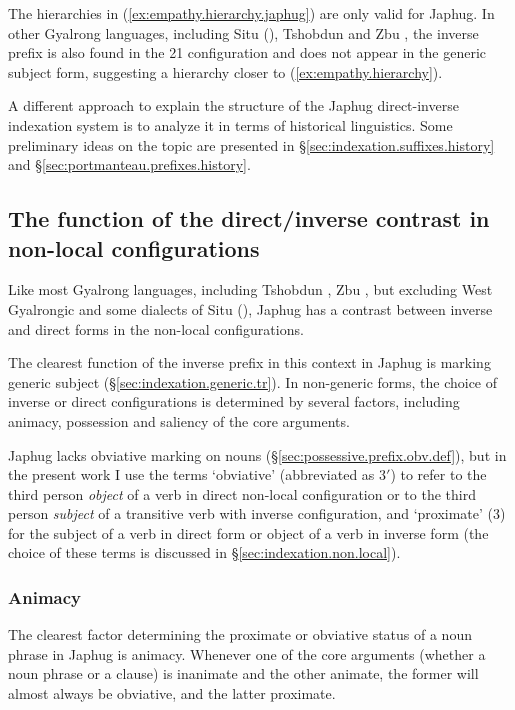 The hierarchies in (\ref{ex:empathy.hierarchy.japhug}) are only valid for Japhug. In other Gyalrong languages, including Situ (\citealt{delancey81direction, jackson15sastod, zhangsy19obviative}), Tshobdun \citep{jackson02rentongdengdi} and Zbu \citep{gongxun14agreement}, the inverse prefix is also found in the 2\fl{}1 configuration and does not appear in the generic subject form, suggesting a hierarchy closer to (\ref{ex:empathy.hierarchy}).

A different approach to explain the structure of the Japhug direct-inverse indexation system is to analyze it in terms of historical linguistics. Some preliminary ideas on the topic are presented in §\ref{sec:indexation.suffixes.history} and §\ref{sec:portmanteau.prefixes.history}.




\subsection{The function of the direct/inverse contrast in non-local configurations} \label{sec:inverse.3.3.saliency}
Like most Gyalrong languages, including Tshobdun \citep{jackson02rentongdengdi}, Zbu \citep{gongxun14agreement}, but excluding West Gyalrongic \citep{lai15person} and some dialects of Situ (\citealt{jackson15sastod, zhangsy19obviative}), Japhug has a contrast between inverse and direct forms in the non-local configurations.

The clearest function of the inverse prefix in this context in Japhug is marking generic subject (§\ref{sec:indexation.generic.tr}).  In non-generic forms, the choice of inverse or direct configurations is determined by several factors, including animacy, possession and saliency of the core arguments.

Japhug lacks obviative marking on nouns (§\ref{sec:possessive.prefix.obv.def}), but in the present work I use the terms `obviative' (abbreviated as 3$'$) to refer to the third person \textit{object} of a verb in direct non-local configuration or to the third person \textit{subject} of a transitive verb with inverse configuration, and `proximate' (3) for the subject of a verb in direct form or object of a verb in inverse form (the choice of these terms is discussed in §\ref{sec:indexation.non.local}).
   
\subsubsection{Animacy}  \label{sec:obviation.animacy}
The clearest factor determining the proximate or obviative status of a noun phrase in Japhug is animacy. Whenever one of the core arguments (whether a noun phrase or a clause) is inanimate and the other animate, the former will almost always be obviative, and the latter proximate. 

